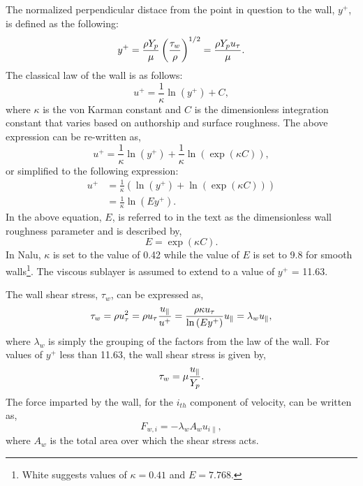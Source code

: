 The normalized perpendicular distace from the point in question to the wall, $y^+$, is defined as
the following:
%
\begin{equation} 
        y^+ = {{ \rho Y_p} \over {\mu }}\left(\tau_w \over \rho \right)^{1/2} 
            = {{ \rho Y_p u_{\tau}} \over {\mu }}.
\label{yplus}
\end{equation}
%
The classical law of the wall is as follows:
%
\begin{equation}
       u^+ = \frac{1}{\kappa} \ln(y^+) + C,
\label{lawOfWall1}
\end{equation}
%
where $\kappa$ is the von Karman constant and $C$ is the dimensionless 
integration constant that varies based on authorship and surface roughness. 
The above expression can be re-written as,
%
\begin{equation}
       u^+ = \frac{1}{\kappa} \ln(y^+) + \frac{1}{\kappa} \ln(\exp(\kappa C)),
\label{lawOfWall2}
\end{equation}
%
or simplified to the following expression:
%
\begin{align}
       u^+ &= \frac{1}{\kappa} \left(\ln(y^+) + \ln(\exp(\kappa C))\right) \\
           &= \frac{1}{\kappa} \ln(E y^+).
\label{lawOfWall3}
\end{align}
%
In the above equation, $E$, is referred to in the text as the dimensionless wall 
roughness parameter and is described by,
%
\begin{equation}
       E = \exp(\kappa C).
\label{ElogParam}
\end{equation}
%
In Nalu, $\kappa$ is set to the value of 0.42 while the 
value of $E$ is set to 9.8 for smooth walls\footnote{White 
suggests values of $\kappa=0.41$ and $E=7.768$.}. 
The viscous sublayer is assumed to extend to a value of $y^+$ = 11.63.

The wall shear stress, $\tau_w$, can be expressed as,
%
\begin{equation} 
        \tau_w = \rho u_\tau^2 = \rho u_\tau {{u_\|} \over {u^+}}
               = { {\rho \kappa u_{\tau}}  \over {\ln \left(Ey^+\right) } }u_\|
               = \lambda_w u_\| ,
\label{wall_shear_trb}
\end{equation}
%
where $\lambda_w$ is simply the grouping of the factors from the law of the wall.
For values of $y^+$ less than 11.63, the wall shear stress is given by,
%
\begin{equation}
        \tau_w =  \mu {u_\| \over Y_p} .
\label{wall_shear_lam}
\end{equation}
%
The force imparted by the wall, for the $i_{th}$ component of velocity,
can be written as,
%
\begin{equation}
        F_{w,i}= -\lambda_w A_w u_{i\|} ,
\label{wall_force_1}
\end{equation}
%
where $A_w$ is the total area over which the shear stress acts.

